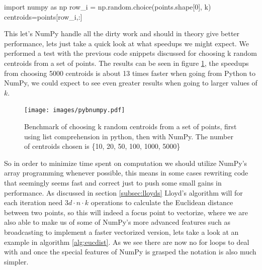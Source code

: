 \documentclass[12pt]{report}
\begin{document}

\begin{python}[caption = {Choosing k random centroids using NumPy.}\label{code:numpykrandom}]
import numpy as np
row_i = np.random.choice(points.shape[0], k)
centroids=points[row_i,:]
\end{python}

This let's NumPy handle all the dirty work and should in theory give better performance, lets just take a quick look at what speedups we might expect. We performed a test with the previous code snippets discussed for choosing k random centroids from a set of points. The results can be seen in figure \ref{fig:numpyvspython}, the speedups from choosing 5000 centroids is about 13 times faster when going from Python to NumPy, we could expect to see even greater results when going to larger values of $k$.

\begin{figure} [H]
  \centering
  \texttt{[image: images/pybnumpy.pdf]}
  \caption{Benchmark of choosing k random centroids from a set of points, first using list comprehension in python, then with NumPy. The number of centroids chosen is \{10, 20, 50, 100, 1000, 5000\}}
  \label{fig:numpyvspython}
\end{figure}

So in order to minimize time spent on computation we should utilize NumPy's array programming whenever possible, this means in some cases rewriting code that seemingly seems fast and correct just to push some small gains in performance.
As discussed in section \ref{subsec:lloyds} Lloyd's algorithm will for each iteration need $3d \cdot n \cdot k$ operations to calculate the Euclidean distance between two points, so this will indeed a focus point to vectorize, where we are also able to make us of some of NumPy's more advanced features such as broadcasting to implement a faster vectorized version, lets take a look at an example in algorithm \ref{alg:eucdist}. As we see there are now no for loops to deal with and once the special features of NumPy is grasped the notation is also much simpler.

\end{document}
